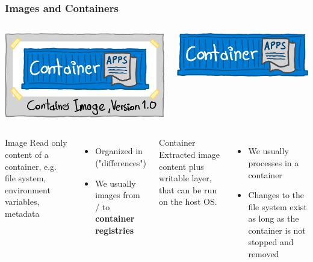 \begin{frame}
	\frametitle{Images and Containers}
	\begin{columns}
		\centering
			\includegraphics[width=.75\textwidth]{pics/container_image.png}
			
		\centering
			\includegraphics[width=.75\textwidth]{pics/container_large.png}
			
	\end{columns}
	\begin{columns}[t]
		\column{.47\textwidth}
		\centering
		\begin{block}{Image}
			Read only content of a container, e.g. file system, environment variables, metadata
		\end{block}
		\begin{itemize}
			\item Organized in  ("differences")
			\item We usually  images from / to \textbf{container registries}
		\end{itemize}
		
		\column{.47\textwidth}
		\centering
		\begin{block}{Container}
			Extracted image content plus writable layer, that can be run on the host OS.
		\end{block}
		\begin{itemize}
			\item We usually  processes in a container
			\item Changes to the file system exist as long as the container is not stopped and removed
		\end{itemize}
	\end{columns}
\end{frame}

